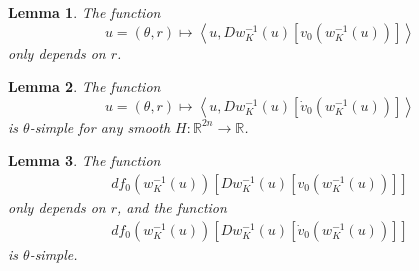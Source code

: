 \documentclass[10pt,a4paper]{amsart}
\newtheorem{lemma}{Lemma}
\newcommand{\RR}{{\mathbb R}}
\begin{document}
\begin{lemma}\label{Dv}
    The function $$u=(\theta,r) \mapsto \left\langle u, Dw_K^{-1}(u)\left[  v_0(w_K^{-1}(u))\right] \right\rangle$$ only depends on $r$.
\end{lemma}

\begin{lemma}\label{Dvdot}
    The function $$u=(\theta,r) \mapsto \left\langle u, Dw_K^{-1}(u)\left[  \dot{v}_0(w_K^{-1}(u))\right] \right\rangle$$ is $\theta$-simple for any smooth $H \colon \RR^{2n}\to \RR$.
\end{lemma}

\begin{lemma}\label{nail}
The function 
\begin{align*}
     df_0 (w_{K}^{-1}(u)) \left[Dw_K^{-1}(u)\left[ v_0(w^{-1}_{K}(u))\right]\right]
\end{align*}
only depends on $r$, and the function
\begin{align*}
     df_0 (w_{K}^{-1}(u)) \left[Dw_K^{-1}(u)\left[ \dot{v}_0(w^{-1}_{K}(u))\right]\right]
\end{align*}
is $\theta$-simple.
\end{lemma}
\end{document}
